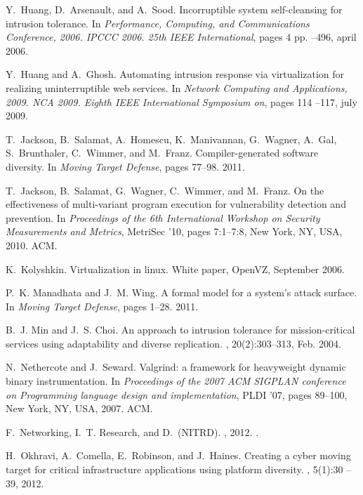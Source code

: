 \documentclass{acm_proc_article-sp}
\begin{document}
\begin{thebibliography}{10}
Y.~Huang, D.~Arsenault, and A.~Sood.
\newblock Incorruptible system self-cleansing for intrusion tolerance.
\newblock In {\em Performance, Computing, and Communications Conference, 2006.
  IPCCC 2006. 25th IEEE International}, pages 4 pp. --496, april 2006.

Y.~Huang and A.~Ghosh.
\newblock Automating intrusion response via virtualization for realizing
  uninterruptible web services.
\newblock In {\em Network Computing and Applications, 2009. NCA 2009. Eighth
  IEEE International Symposium on}, pages 114 --117, july 2009.

T.~Jackson, B.~Salamat, A.~Homescu, K.~Manivannan, G.~Wagner, A.~Gal,
  S.~Brunthaler, C.~Wimmer, and M.~Franz.
\newblock Compiler-generated software diversity.
\newblock In {\em Moving Target Defense}, pages 77--98. 2011.

T.~Jackson, B.~Salamat, G.~Wagner, C.~Wimmer, and M.~Franz.
\newblock On the effectiveness of multi-variant program execution for
  vulnerability detection and prevention.
\newblock In {\em Proceedings of the 6th International Workshop on Security
  Measurements and Metrics}, MetriSec '10, pages 7:1--7:8, New York, NY, USA,
  2010. ACM.

K.~Kolyshkin.
\newblock Virtualization in linux.
\newblock White paper, OpenVZ, September 2006.

P.~K. Manadhata and J.~M. Wing.
\newblock A formal model for a system's attack surface.
\newblock In {\em Moving Target Defense}, pages 1--28. 2011.

B.~J. Min and J.~S. Choi.
\newblock An approach to intrusion tolerance for mission-critical services
  using adaptability and diverse replication.
, 20(2):303--313, Feb. 2004.

N.~Nethercote and J.~Seward.
\newblock Valgrind: a framework for heavyweight dynamic binary instrumentation.
\newblock In {\em Proceedings of the 2007 ACM SIGPLAN conference on Programming
  language design and implementation}, PLDI '07, pages 89--100, New York, NY,
  USA, 2007. ACM.

F.~Networking, I.~T. Research, and D.~(NITRD).
, 2012.
.

H.~Okhravi, A.~Comella, E.~Robinson, and J.~Haines.
\newblock Creating a cyber moving target for critical infrastructure
  applications using platform diversity.
,
  5(1):30 -- 39, 2012.


\end{thebibliography}
\end{document}
